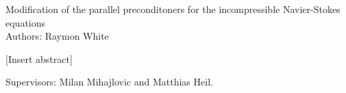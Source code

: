   \begin{center}
    Modification of the parallel preconditoners for the incompressible Navier-Stokes equations \\
    Authors: Raymon White
  \end{center}
[Insert abstract]
  \begin{center}
    Supervisors: Milan Mihajlovic and Matthias Heil.
  \end{center}
